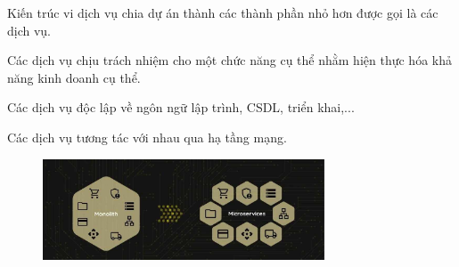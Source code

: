 Kiến trúc vi dịch vụ chia dự án thành các thành phần nhỏ hơn được gọi là các dịch vụ.

Các dịch vụ chịu trách nhiệm cho một chức năng cụ thể nhằm hiện thực hóa khả năng kinh doanh cụ thể.

Các dịch vụ độc lập về ngôn ngữ lập trình, CSDL, triển khai,...

Các dịch vụ tương tác với nhau qua hạ tầng mạng.

\begin{figure}[h]
\centering
\includegraphics[height = 3cm]{pictures/ChuyenTu_KienTrucNguyenKhoi_Sang_KienTrucViDichVu.jpg}
\end{figure}

